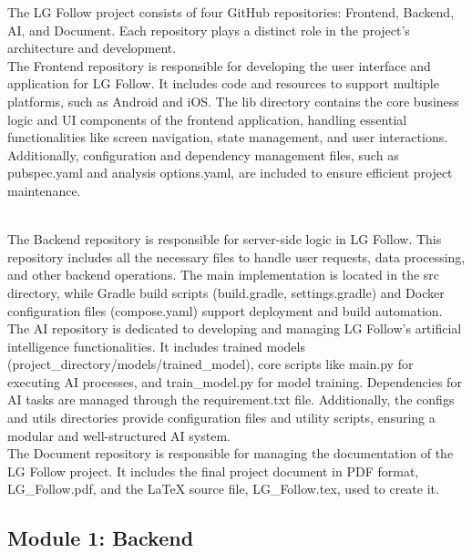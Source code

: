 \documentclass[conference]{IEEEtran}
\begin{document}
The LG Follow project consists of four GitHub repositories: Frontend, Backend, AI, and Document. Each repository plays a distinct role in the project’s architecture and development.\\

The Frontend repository is responsible for developing the user interface and application for LG Follow. It includes code and resources to support multiple platforms, such as Android and iOS. The lib directory contains the core business logic and UI components of the frontend application, handling essential functionalities like screen navigation, state management, and user interactions. Additionally, configuration and dependency management files, such as pubspec.yaml and analysis options.yaml, are included to ensure efficient project maintenance.\\
\

The Backend repository is responsible for server-side logic in LG Follow. This repository includes all the necessary files to handle user requests, data processing, and other backend operations. The main implementation is located in the src directory, while Gradle build scripts (build.gradle, settings.gradle) and Docker configuration files (compose.yaml) support deployment and build automation.\\

The AI repository is dedicated to developing and managing LG Follow’s artificial intelligence functionalities. It includes trained models (project\_directory/models/trained\_model), core scripts like main.py for executing AI processes, and train\_model.py for model training. Dependencies for AI tasks are managed through the requirement.txt file. Additionally, the configs and utils directories provide configuration files and utility scripts, ensuring a modular and well-structured AI system.\\

The Document repository is responsible for managing the documentation of the LG Follow project. It includes the final project document in PDF format, LG\_Follow.pdf, and the LaTeX source file, LG\_Follow.tex, used to create it.\\

\subsection{Module 1: Backend}
\end{document}
